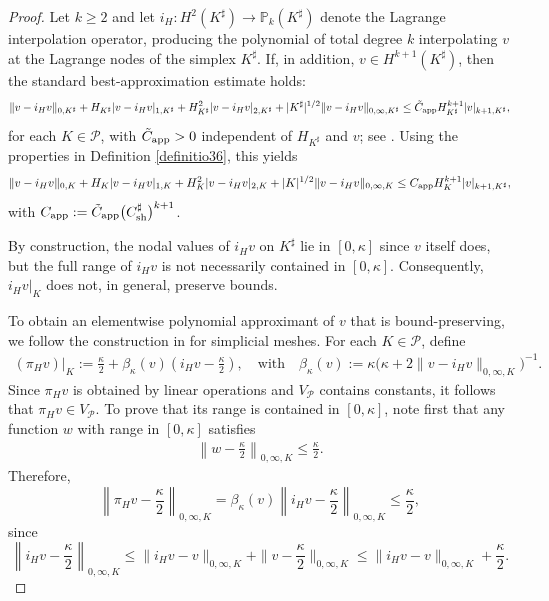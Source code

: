\documentclass[11pt,final]{amsart}
\theoremstyle{plain}
\theoremstyle{definition}
\newcommand\calP{{\mathcal{P}}}
\newcommand{\mesh}{\calP}
\newcommand{\norm}[2]{\|{#1}\|_{{#2}}}
\renewcommand{\k}{K}
\newcommand{\ksh}{{K^{\sharp}}}
\begin{document}
\begin{proof}
  Let $k\ge 2$ and let $i_{H}:H^2(\ksh)\to \mathbb{P}_k(\ksh)$ denote
  the Lagrange interpolation operator, producing the polynomial of
  total degree $k$ interpolating $v$ at the Lagrange nodes of the
  simplex $\ksh$. If, in addition, $v\in H^{k+1}(\ksh)$, then the
  standard best-approximation estimate holds:
  \begin{equation}
    \norm{v- i_{H}v}{0,\ksh}+H_{\ksh} |v-i_{H}v|_{1,\ksh}+H_{\ksh}^2 |v-i_{H}v|_{2,\ksh}+|\ksh|^{1/2}\norm{v- i_{H}v}{0,\infty,\ksh}\le  \tilde{C}_{\rm app} H_{\ksh}^{k +1}|v |_{k +1,\ksh}, 
    \label{lagranges}
  \end{equation} 
  for each $\k\in\mesh$, with $\tilde{C}_{\rm app}>0$ independent of
  $H_{\ksh}$ and $v$; see \cite[Theorem 3.1.4]{ciarlet}. Using the
  properties in Definition \ref{definitio36}, this yields
  \begin{equation}\label{lagrange}
    \norm{v- i_{H}v}{0,\k}+H_{\k} |v-i_{H}v|_{1,\k}+H_{\k}^2 |v-i_{H}v|_{2,\k}+|\k|^{1/2}\norm{v- i_{H}v}{0,\infty,\k}\leq  C_{\rm app} H_{\k}^{k+1}|v |_{k+1,\ksh},
  \end{equation} 
  with $C_{\rm app}:= \tilde{C}_{\rm app} \big(C_{\rm
    sh}^{\sharp}\big)^{k+1}$.
  
  By construction, the nodal values of $i_{H}v$ on $\ksh$ lie in
  $[0,\kappa]$ since $v$ itself does, but the full range of $i_{H}v$
  is not necessarily contained in $[0,\kappa]$. Consequently,
  $i_{H}v|_\k$ does not, in general, preserve bounds.
  
  To obtain an elementwise polynomial approximant of $v$ that is
  bound-preserving, we follow the construction in \cite[Theorem
    2]{Kirby4755186} for simplicial meshes. For each $\k\in \mesh$,
  define
  \begin{align*}
    (\pi_{H}v)|_\k :=\frac{\kappa}{2} + \beta_\kappa(v) \left(i_{H}v - \frac{\kappa}{2}\right), \quad\text{with}\quad \beta_\kappa(v):=\kappa\big(\kappa+2\norm{v -i_{H}v}{0,\infty,K}\big)^{-1}.
  \end{align*}
  Since $\pi_{H}v $ is obtained by linear operations and $V_\mesh$
  contains constants, it follows that $ \pi_{H}v \in V_\mesh$. To
  prove that its range is contained in $[0, \kappa]$, note first that
  any function $w$ with range in $[0,\kappa]$ satisfies
\begin{align}
\left\|w -\frac{\kappa}{2}\right\|_{0,\infty,K} \leq  \frac{\kappa}{2}.\label{inequalit32456}
\end{align}
Therefore,
\[
\left\|\pi_{H}v  - \frac{\kappa}{2}\right\|_{0,\infty,\k} = \beta_\kappa(v) \left\|i_{H}v - \frac{\kappa}{2}\right\|_{0,\infty,\k} \le \frac{\kappa}{2},
\]
since
\[
\left\|i_{H}v - \frac{\kappa}{2}\right\|_{0,\infty,\k}\le \norm{i_{H}v -v}{0,\infty,\k}+\norm{v - \frac{\kappa}{2}}{0,\infty,\k}\le \norm{i_{H}v -v}{0,\infty,\k}+\frac{\kappa}{2}.
\]


\end{proof}
\end{document}
